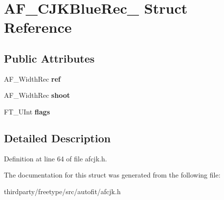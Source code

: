 \hypertarget{struct_a_f___c_j_k_blue_rec__}{}\section{A\+F\+\_\+\+C\+J\+K\+Blue\+Rec\+\_\+ Struct Reference}
\label{struct_a_f___c_j_k_blue_rec__}
\subsection*{Public Attributes}
\begin{DoxyCompactItemize}
\item 
\mbox{\label{struct_a_f___c_j_k_blue_rec___aba8d0c59e133e266ede02f0dfe9d76e0}} 
A\+F\+\_\+\+Width\+Rec {\bfseries ref}
\item 
\mbox{\label{struct_a_f___c_j_k_blue_rec___a39c6eacbbe942571101e3ec0f9b3b621}} 
A\+F\+\_\+\+Width\+Rec {\bfseries shoot}
\item 
\mbox{\label{struct_a_f___c_j_k_blue_rec___a5cc3a59d1029c2ff91fd5c9def04bbbc}} 
F\+T\+\_\+\+U\+Int {\bfseries flags}
\end{DoxyCompactItemize}


\subsection{Detailed Description}


Definition at line 64 of file afcjk.\+h.



The documentation for this struct was generated from the following file\+:\begin{DoxyCompactItemize}
\item 
thirdparty/freetype/src/autofit/afcjk.\+h\end{DoxyCompactItemize}

